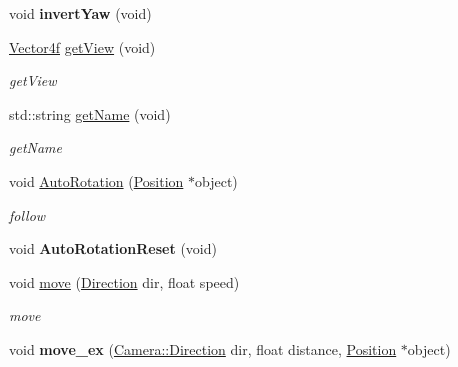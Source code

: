 \begin{DoxyCompactItemize}
\item 
\hypertarget{classEngine_1_1Camera_ab9ad7d4d0158ab8f3580f50244d5e67e}{}void {\bfseries invert\+Yaw} (void)\label{classEngine_1_1Camera_ab9ad7d4d0158ab8f3580f50244d5e67e}

\item 
\hyperlink{classVector4}{Vector4f} \hyperlink{classEngine_1_1Camera_a433f03de6ad715da69536f8e521dd8c7}{get\+View} (void)
\begin{DoxyCompactList}\small\item\em get\+View \end{DoxyCompactList}\item 
std\+::string \hyperlink{classEngine_1_1Camera_a1ac6dd58e8986f523dabcf4e91e04a26}{get\+Name} (void)
\begin{DoxyCompactList}\small\item\em get\+Name \end{DoxyCompactList}\item 
void \hyperlink{classEngine_1_1Camera_a13c461546b6141eb6baabb54419e6476}{Auto\+Rotation} (\hyperlink{classEngine_1_1Position}{Position} $\ast$object)
\begin{DoxyCompactList}\small\item\em follow \end{DoxyCompactList}\item 
\hypertarget{classEngine_1_1Camera_a000392f7de2ae12bed38baed2449872d}{}void {\bfseries Auto\+Rotation\+Reset} (void)\label{classEngine_1_1Camera_a000392f7de2ae12bed38baed2449872d}

\item 
void \hyperlink{classEngine_1_1Camera_a3261c7dbede2662496927861f19dbd92}{move} (\hyperlink{classEngine_1_1Camera_a54aed52433cefef871f5d0b294b7e87b}{Direction} dir, float speed)
\begin{DoxyCompactList}\small\item\em move \end{DoxyCompactList}\item 
\hypertarget{classEngine_1_1Camera_a9ab2ad1245b516e2a51f6007c2b2d9c3}{}void {\bfseries move\+\_\+ex} (\hyperlink{classEngine_1_1Camera_a54aed52433cefef871f5d0b294b7e87b}{Camera\+::\+Direction} dir, float distance, \hyperlink{classEngine_1_1Position}{Position} $\ast$object)\label{classEngine_1_1Camera_a9ab2ad1245b516e2a51f6007c2b2d9c3}


\end{DoxyCompactItemize}
